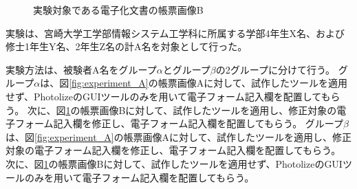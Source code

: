 \begin{figure}[t]
    \begin{center}
        \caption{実験対象である電子化文書の帳票画像B}
        \label{fig:experiment_B}
    \end{center}
\end{figure}

実験は、宮崎大学工学部情報システム工学科に所属する学部4年生X名、および修士1年生Y名、2年生Z名の計A名を対象として行った。

実験方法は、被験者A名をグループ$\alpha$とグループ$\beta$の2グループに分けて行う。
グループ$\alpha$は、図\ref{fig:experiment_A}の帳票画像Aに対して、試作したツールを適用せず、PhotolizeのGUIツールのみを用いて電子フォーム記入欄を配置してもらう。
次に、図\ref{fig:experiment_B}の帳票画像Bに対して、試作したツールを適用し、修正対象の電子フォーム記入欄を修正し、電子フォーム記入欄を配置してもらう。
グループ$\beta$は、図\ref{fig:experiment_A}の帳票画像Aに対して、試作したツールを適用し、修正対象の電子フォーム記入欄を修正し、電子フォーム記入欄を配置してもらう。
次に、図\ref{fig:experiment_B}の帳票画像Bに対して、試作したツールを適用せず、PhotolizeのGUIツールのみを用いて電子フォーム記入欄を配置してもらう。

